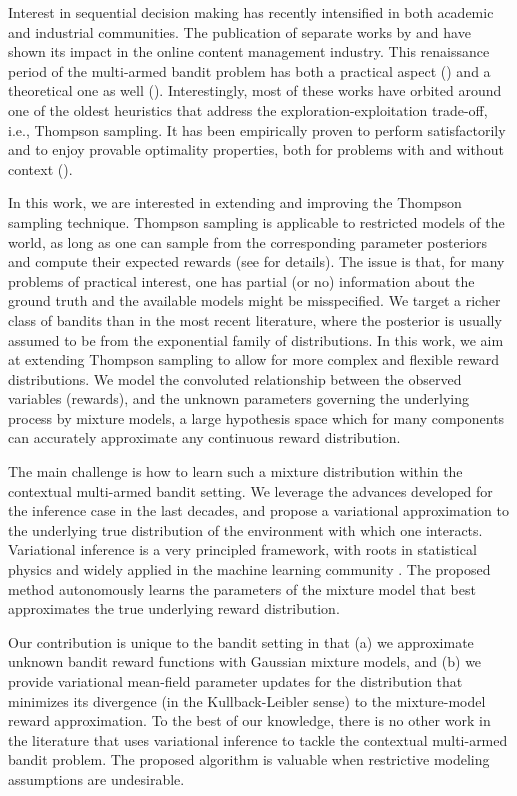 \documentclass[10pt]{article}
\newcommand{\ie}{i.e., }
\begin{document}
Interest in sequential decision making has recently intensified in both academic and industrial communities. The publication of separate works by \cite{ic-Chapelle2011} and \cite{j-Scott2015} have shown its impact in the online content management industry. This renaissance period of the multi-armed bandit problem has both a practical aspect (\cite{j-Li2010}) and a theoretical one as well (\cite{j-Scott2010,j-Agrawal2011,ip-Maillard2011}). Interestingly, most of these works have orbited around one of the oldest heuristics that address the exploration-exploitation trade-off, \ie Thompson sampling. It has been empirically proven to perform satisfactorily and to enjoy provable optimality properties, both for problems with and without context (\cite{j-Agrawal2012,j-Agrawal2012a,ic-Korda2013,j-Russo2014,j-Russo2016}).

In this work, we are interested in extending and improving the Thompson sampling technique. Thompson sampling is applicable to restricted models of the world, as long as one can sample from the corresponding parameter posteriors and compute their expected rewards (see \cite{j-Scott2010} for details). The issue is that, for many problems of practical interest, one has partial (or no) information about the ground truth and the available models might be misspecified. We target a richer class of bandits than in the most recent literature, where the posterior is usually assumed to be from the exponential family of distributions. In this work, we aim at extending Thompson sampling to allow for more complex and flexible reward distributions. We model the convoluted relationship between the observed variables (rewards), and the unknown parameters governing the underlying process by mixture models, a large hypothesis space which for many components can accurately approximate any continuous reward distribution.

The main challenge is how to learn such a mixture distribution within the contextual multi-armed bandit setting. We leverage the advances developed for the inference case in the last decades, and propose a variational approximation to the underlying true distribution of the environment with which one interacts. Variational inference is a very principled framework, with roots in statistical physics and widely applied in the machine learning community \cite{b-Bishop2006}. The proposed method autonomously learns the parameters of the mixture model that best approximates the true underlying reward distribution.

Our contribution is unique to the bandit setting in that (a) we approximate unknown bandit reward functions with Gaussian mixture models, and (b) we provide variational mean-field parameter updates for the distribution that minimizes its divergence (in the Kullback-Leibler sense) to the mixture-model reward approximation. To the best of our knowledge, there is no other work in the literature that uses variational inference to tackle the contextual multi-armed bandit problem. The proposed algorithm is valuable when restrictive modeling assumptions are undesirable.
\end{document}
